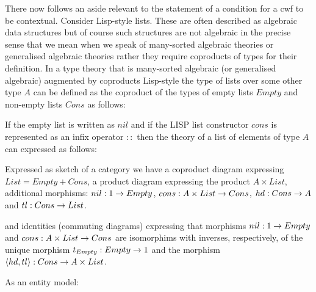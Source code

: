 \documentclass[10pt,a4paper]{article}
\theoremstyle{remark}
\begin{document}
\note 
There now follows an aside relevant to the statement of a  condition for a cwf to be contextual. Consider  Lisp-style lists. These  are often described as algebraic data structures but of course such structures are not algebraic in the precise sense that we mean when we speak of many-sorted algebraic theories or generalised algebraic theories rather they require coproducts of types for their definition. In a type theory that is many-sorted algebraic (or generalised algebraic) augmented by coproducts Lisp-style the type of lists over some other type $A$ can be defined as the coproduct of the types of empty lists $Empty$ and non-empty lists $Cons$
 as follows:\\



\begin{minipage}{\textwidth}
\begin{notebox}

If the empty list is written as $nil$ and if the LISP list constructor $cons$ is represented
as an infix operator $::$ then the theory of a list of elements of type $A$ can expressed as follows: 
\begin{gatrules}
\gatintros
{}   
\gataxioms
{}                            
\end{gatrules}
Expressed as sketch of a category we have a coproduct diagram
expressing $List = Empty + Cons$,
a product diagram expressing the product $A \times List$,
additional morphisms:
$nil: 1 \rightarrow Empty$,
$cons : A \times List \rightarrow Cons$,
$hd: Cons \rightarrow A$ and
$tl: Cons \rightarrow List$.

and identities (commuting diagrams) expressing that
morphisms $nil: 1 \rightarrow Empty$ and $cons : A \times List \rightarrow Cons$ are isomorphims 
with inverses, respectively, of the unique morphism $t_{Empty}: Empty \rightarrow 1$
and the morphism $\langle hd,tl\rangle:Cons \rightarrow A \times List$. 

As an entity model:
\begin{center}
 
\end{center}
\end{notebox}
\end{minipage}
\newpage

 

\end{document}
